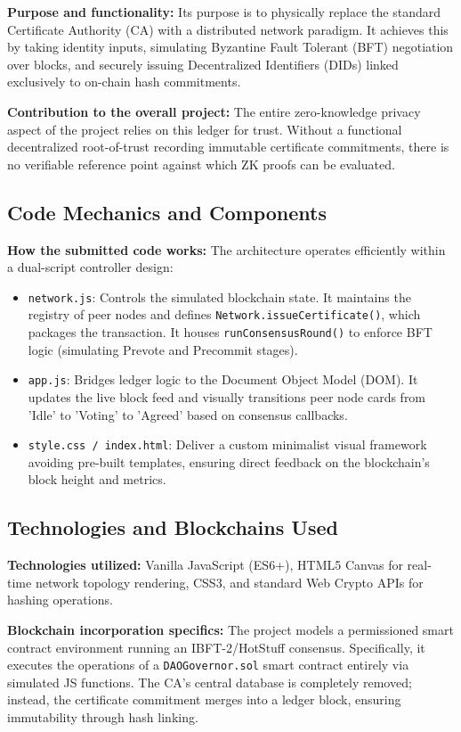 \documentclass[12pt,a4paper]{article}
\begin{document}
\textbf{Purpose and functionality:} Its purpose is to physically replace the standard Certificate Authority (CA) with a distributed network paradigm. It achieves this by taking identity inputs, simulating Byzantine Fault Tolerant (BFT) negotiation over blocks, and securely issuing Decentralized Identifiers (DIDs) linked exclusively to on-chain hash commitments.

\textbf{Contribution to the overall project:} The entire zero-knowledge privacy aspect of the project relies on this ledger for trust. Without a functional decentralized root-of-trust recording immutable certificate commitments, there is no verifiable reference point against which ZK proofs can be evaluated.

\subsection{Code Mechanics and Components}
\textbf{How the submitted code works:} 
The architecture operates efficiently within a dual-script controller design:
\begin{itemize}
    \item \texttt{network.js}: Controls the simulated blockchain state. It maintains the registry of peer nodes and defines \texttt{Network.issueCertificate()}, which packages the transaction. It houses \texttt{runConsensusRound()} to enforce BFT logic (simulating Prevote and Precommit stages).
    \item \texttt{app.js}: Bridges ledger logic to the Document Object Model (DOM). It updates the live block feed and visually transitions peer node cards from 'Idle' to 'Voting' to 'Agreed' based on consensus callbacks.
    \item \texttt{style.css / index.html}: Deliver a custom minimalist visual framework avoiding pre-built templates, ensuring direct feedback on the blockchain's block height and metrics.
\end{itemize}

\subsection{Technologies and Blockchains Used}
\textbf{Technologies utilized:} Vanilla JavaScript (ES6+), HTML5 Canvas for real-time network topology rendering, CSS3, and standard Web Crypto APIs for hashing operations. 

\textbf{Blockchain incorporation specifics:} The project models a permissioned smart contract environment running an IBFT-2/HotStuff consensus. Specifically, it executes the operations of a \texttt{DAOGovernor.sol} smart contract entirely via simulated JS functions. The CA's central database is completely removed; instead, the certificate commitment merges into a ledger block, ensuring immutability through hash linking.
\end{document}
